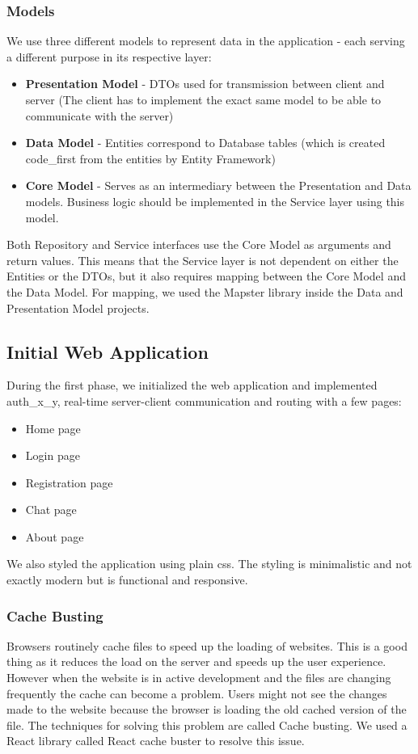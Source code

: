 \subsubsection*{Models}
We use three different models to represent data in the application - each serving a different purpose in its respective layer:
\begin{itemize}
    \item \textbf{Presentation Model} - DTOs used for transmission between client and server
 (The client has to implement the exact same model to be able to communicate with the server)
    \item \textbf{Data Model} - Entities correspond to Database tables
 (which is created \gls{code_first} from the entities by Entity Framework)
    \item \textbf{Core Model} - Serves as an intermediary between the Presentation and Data models.
 Business logic should be implemented in the Service layer using this model.
\end{itemize}

Both Repository and Service interfaces use the Core Model as arguments and return values.
This means that the Service layer is not dependent on either the Entities or the DTOs,
but it also requires mapping between the Core Model and the Data Model.
For mapping, we used the Mapster library inside the Data and Presentation Model projects.

\subsection{Initial Web Application}
During the first phase, we initialized the web application and implemented \gls{auth_x_y},
real-time server-client communication and routing with a few pages:
\begin{itemize}
    \item Home page
    \item Login page
    \item Registration page
    \item Chat page
    \item About page
\end{itemize}

We also styled the application using plain css. The styling is minimalistic and not exactly modern but is functional and responsive.

\subsubsection{Cache Busting}
\label{sec:cache_busting}
Browsers routinely cache files to speed up the loading of websites.
This is a good thing as it reduces the load on the server and speeds up the user experience.
However when the website is in active development and the files are changing frequently the cache can become a problem.
Users might not see the changes made to the website because the browser is loading the old cached version of the file.
The techniques for solving this problem are called Cache busting. We used a React library called React cache buster to resolve this issue.

